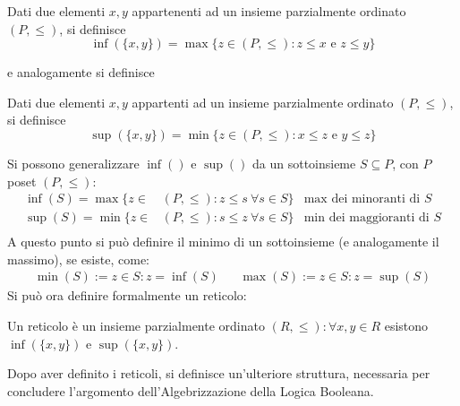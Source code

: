 \begin{defi}
  Dati due elementi $x, y$ appartenenti ad un insieme parzialmente ordinato $(P, \leq)$, si definisce 
  $$
  \inf(\{x,y\}) = \max\{z \in (P, \leq): z \leq x \text{ e } z \leq y\}
  $$
\end{defi}
e analogamente si definisce 
\begin{defi}
  Dati due elementi $x, y$ appartenti ad un insieme parzialmente ordinato $(P, \leq)$, si definisce 
  $$
  \sup(\{x,y\}) = \min\{z \in (P, \leq): x \leq z \text{ e } y \leq z\}
  $$
\end{defi}
Si possono generalizzare $\inf()$ e $\sup()$ da un sottoinsieme $S \subseteq P$, con 
$P$ poset $(P, \leq)$:
\begin{align*}
  \inf(S) = \max\{z \in & (P, \leq): z \leq s\ \forall s \in S\} & \text{max dei minoranti di } S \\
  \sup(S) = \min\{z \in & (P, \leq): s \leq z\ \forall s \in S\} & \text{min dei maggioranti di } S \\
\end{align*}
A questo punto si può definire il minimo di un sottoinsieme (e analogamente il massimo), se esiste, come: 
\begin{align*}
  \min(S) := z \in S : z = \inf(S) &&
  \max(S) := z \in S : z = \sup(S)
\end{align*}
Si può ora definire formalmente un reticolo: 
\begin{defi}
Un reticolo è un insieme parzialmente ordinato $(R, \leq) : \forall x, y \in R$ esistono $\inf(\{x,y\})$ e $\sup(\{x,y\})$. 
\end{defi}

\noindent 
Dopo aver definito i reticoli, si definisce un'ulteriore struttura, necessaria per concludere l'argomento dell'Algebrizzazione della Logica Booleana. 

